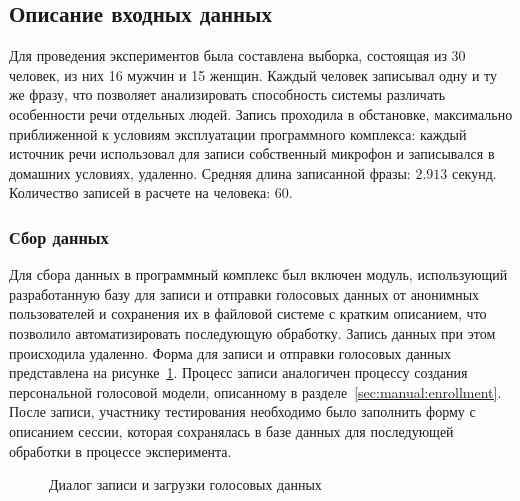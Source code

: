 \subsection{Описание входных данных}

Для проведения экспериментов была составлена выборка, состоящая из 30 человек,
из них 16 мужчин и 15 женщин. Каждый человек записывал одну и ту же фразу, что
позволяет анализировать способность системы различать особенности речи отдельных
людей. Запись проходила в обстановке, максимально приближенной к условиям
эксплуатации программного комплекса: каждый источник речи использовал для записи
собственный микрофон и записывался в домашних условиях, удаленно. Средняя длина
записанной фразы: $2.913$ секунд. Количество записей в расчете на человека:
$60$.

\subsubsection*{Сбор данных}

Для сбора данных в программный комплекс был включен модуль, использующий
разработанную базу для записи и отправки голосовых данных от анонимных
пользователей и сохранения их в файловой системе с кратким описанием, что
позволило автоматизировать последующую обработку. Запись данных при этом
происходила удаленно. Форма для записи и отправки голосовых данных представлена
на рисунке~\ref{fig:ui:voice_upload}. Процесс записи аналогичен процессу
создания персональной голосовой модели, описанному в
разделе~\ref{sec:manual:enrollment}. После записи, участнику тестирования
необходимо было заполнить форму с описанием сессии, которая сохранялась в базе
данных для последующей обработки в процессе эксперимента.

\begin{figure}[ht!]
\caption{Диалог записи и загрузки голосовых данных}
\label{fig:ui:voice_upload}
\end{figure}

